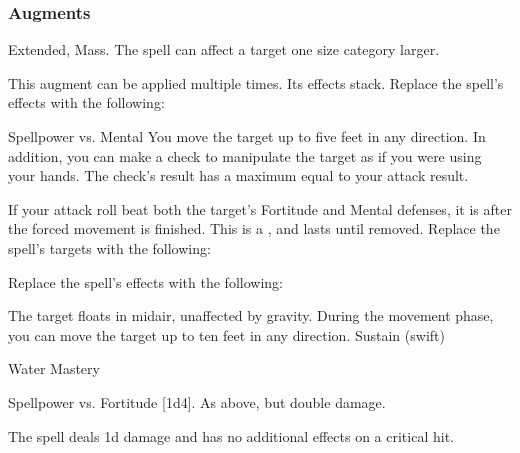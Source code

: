 \subsubsection{Augments}
 Extended, Mass.
The spell can affect a target one size category larger.
\par
This augment can be applied multiple times.
Its effects stack.
Replace
the spell's effects with the following:
\begin{augmenteffects}
\begin{spellattack}{Spellpower vs. Mental}
\spellsuccess
You move the target up to five feet in any direction.
In addition, you can make a check to manipulate the target as if you were using your hands.
The check's result has a maximum equal to your attack result.
\end{spellattack}
\end{augmenteffects}
If your attack roll beat both the target's Fortitude and Mental defenses, it is \immobilized after the forced movement is finished.
This is a , and lasts until removed.
Replace
the spell's targets with the following:
\begin{augmenttargetinginfo}
\end{augmenttargetinginfo}
Replace
the spell's effects with the following:
\begin{augmenteffects}
\spelleffect
The target floats in midair, unaffected by gravity.
During the movement phase, you can move the target up to ten feet in any direction.
\spelldur Sustain (swift)
\end{augmenteffects}
\begin{spellsection}{Water Mastery}
\begin{spellheader}
\end{spellheader}
\begin{spellcontent}
\begin{spelltargetinginfo}
\end{spelltargetinginfo}
\begin{spelleffects}
\begin{spellattack}{Spellpower vs. Fortitude}
\spellsuccess {}[1d4].
\spellcritical As above, but double damage.
\end{spellattack}
\end{spelleffects}
\end{spellcontent}
\begin{spellfooter}
\miscastexplode
\end{spellfooter}
\begin{spellcantrip}
The spell deals \minus1d damage and has no additional effects on a critical hit.
\end{spellcantrip}
\end{spellsection}
